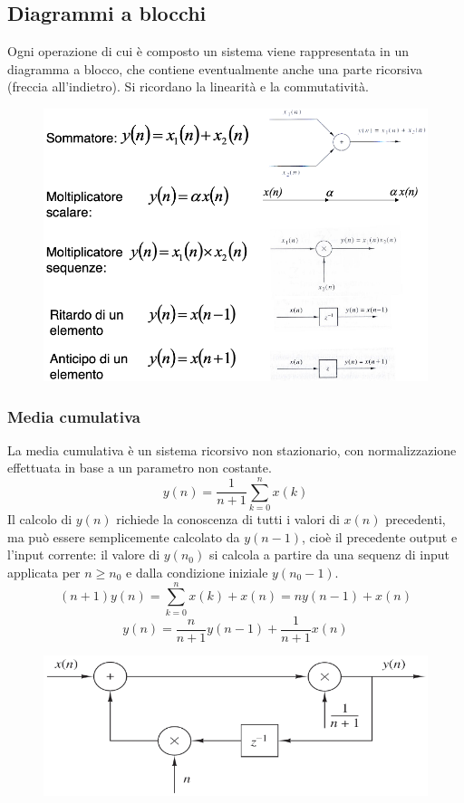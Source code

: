 \subsection{Diagrammi a blocchi}
Ogni operazione di cui è composto un sistema viene rappresentata in un diagramma a blocco, che contiene eventualmente anche una parte ricorsiva (freccia all'indietro). Si ricordano la linearità e la commutatività.
\begin{figure}[h]
	\centering
	\includegraphics[scale=0.4]{Lezioni/Immagini/blocchi}
\end{figure}

\subsubsection{Media cumulativa}
La media cumulativa è un sistema ricorsivo non stazionario, con normalizzazione effettuata in base a un parametro non costante. 
$$y(n) = \frac{1}{n+1} \sum_{k=0}^{n}x(k)$$
Il calcolo di $y(n)$ richiede la conoscenza di tutti i valori di $x(n)$ precedenti, ma può essere semplicemente calcolato da $y(n-1)$, cioè il precedente output e l'input corrente: il valore di $y(n_0)$ si calcola a partire da una sequenz di input applicata per $n \geq n_0$ e dalla condizione iniziale $y(n_0 - 1)$.
$$(n + 1) y(n) = \sum_{k=0}^{n} x(k) + x(n) = ny(n-1) + x(n)$$
$$y(n) = \frac{n}{n+1} y(n-1) + \frac{1}{n+1} x(n)$$

\begin{figure}[h]
	\centering
	\includegraphics[scale=0.4]{Lezioni/Immagini/media}
\end{figure}

